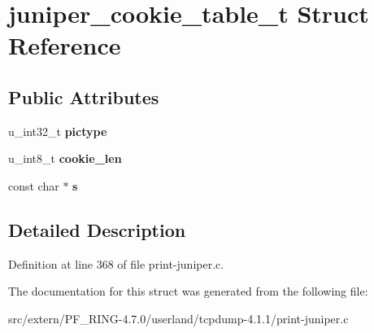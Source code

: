 \hypertarget{structjuniper__cookie__table__t}{
\section{juniper\_\-cookie\_\-table\_\-t Struct Reference}
\label{structjuniper__cookie__table__t}
}
\subsection*{Public Attributes}
\begin{DoxyCompactItemize}
\item 
\hypertarget{structjuniper__cookie__table__t_af03196dc996f591327e79635745a71f4}{
u\_\-int32\_\-t {\bfseries pictype}}
\label{structjuniper__cookie__table__t_af03196dc996f591327e79635745a71f4}

\item 
\hypertarget{structjuniper__cookie__table__t_a7078592c2ea0826696654038926916e6}{
u\_\-int8\_\-t {\bfseries cookie\_\-len}}
\label{structjuniper__cookie__table__t_a7078592c2ea0826696654038926916e6}

\item 
\hypertarget{structjuniper__cookie__table__t_a115005f7b1424b0b741f3fdaa2db6d1a}{
const char $\ast$ {\bfseries s}}
\label{structjuniper__cookie__table__t_a115005f7b1424b0b741f3fdaa2db6d1a}

\end{DoxyCompactItemize}


\subsection{Detailed Description}


Definition at line 368 of file print-\/juniper.c.



The documentation for this struct was generated from the following file:\begin{DoxyCompactItemize}
\item 
src/extern/PF\_\-RING-\/4.7.0/userland/tcpdump-\/4.1.1/print-\/juniper.c\end{DoxyCompactItemize}

